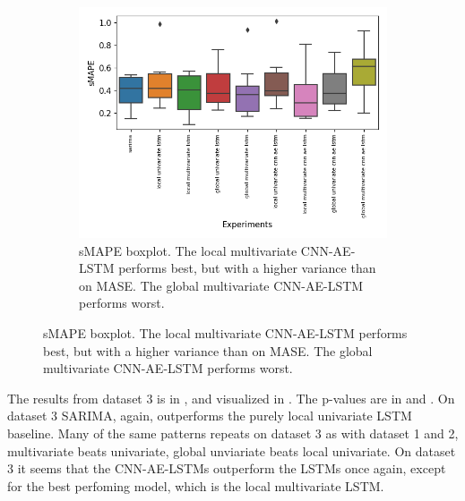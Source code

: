 \begin{samepage}
\begin{figure}[h!]
\begin{subfigure}[t]{0.49\textwidth}
    \end{subfigure}
    \begin{subfigure}[t]{0.49\textwidth}
      \includegraphics[width=\textwidth]{./figs/results/boxplot/smape-dataset_3.png}
      \hfill
      \caption{sMAPE boxplot. The local multivariate CNN-AE-LSTM performs best,
        but with a higher variance than on MASE.
        The global multivariate CNN-AE-LSTM performs worst.}
      \label{fig:results:boxplot-smape-dataset-3}
    \end{subfigure}
    \label{fig:results:boxplot-dataset-3}
  \end{figure}
\end{samepage}
The results from dataset 3 is in ,
and visualized in .
The p-values are in  and
.
On dataset 3 SARIMA, again, outperforms the purely local univariate LSTM baseline.
Many of the same patterns repeats on dataset 3 as with dataset 1 and 2, multivariate beats univariate,
global unviariate beats local univariate.
On dataset 3 it seems that the CNN-AE-LSTMs outperform the LSTMs once again, except for the
best perfoming model, which is the local multivariate LSTM.

